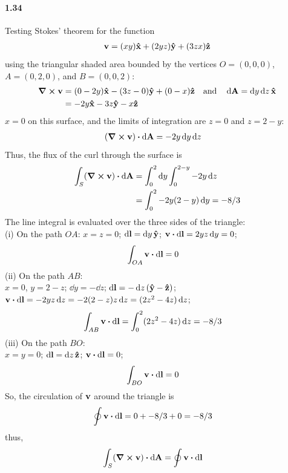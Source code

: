 \documentclass[../main.tex]{subfiles}
\begin{document}
\paragraph{1.34}
Testing Stokes' theorem for the function
\begin{align*}
    \vb{v} = (xy) \vu{x} + (2yz) \vu{y} + (3zx)\vu{z}
\end{align*}
using the triangular shaded area bounded by the vertices
$O = (0,0,0)$, $A = (0,2,0)$, and $B = (0,0,2)$:
\begin{align*}
    \curl{\vb{v}} &= (0 - 2y) \vu{x} - (3z - 0) \vu{y} + (0 - x) \vu{z}
                                                        \qand \dd{\vb{A}} = \dd{y}\dd{z} \vu{x} \\
                  &= -2y \vu{x} - 3z \vu{y} - x \vu{z}
\end{align*}
$x=0$ on this surface, and the limits of integration are $z = 0$ and $z = 2 - y$:
\begin{align*}
    (\curl{\vb{v}}) \vdot \dd{\vb{A}} &= -2y \dd{y}\dd{z}
\end{align*}
Thus, the flux of the curl through the surface is
\begin{align*}
    \int_S (\curl{\vb{v}}) \vdot \dd{\vb{A}} &= \int_0^2 \dd{y}\int_0^{2-y} -2y \dd{z} \\
    &= \int_0^2 -2y(2-y) \dd{y} = -8/3
\end{align*}
The line integral is evaluated over the three sides of the triangle: \\
(i) On the path $OA$:
$x = z = 0$; $\dd{\vb{l}} = \dd{y} \vu{y}$; $\vb{v} \vdot \dd{\vb{l}} = 2yz \dd{y} = 0$;
\begin{align*}
    \int_{OA} \vb{v} \vdot \dd{\vb{l}} &= 0
\end{align*}
(ii) On the path $AB$: \\
$x = 0$, $y = 2 - z$; $\dd{y} = -\dd{z}$; $\dd{\vb{l}} = -\dd{z}(\vu{y} - \vu{z})$;
$\vb{v} \vdot \dd{\vb{l}} = -2yz \dd{z} = -2(2 - z)z \dd{z} = (2z^2 - 4z) \dd{z}$;
\begin{align*}
    \int_{AB} \vb{v} \vdot \dd{\vb{l}} &= \int_0^2 (2z^2 - 4z) \dd{z} = -8/3
\end{align*}
(iii) On the path $BO$: \\
$x = y = 0$; $\dd{\vb{l}} = \dd{z} \vu{z}$; $\vb{v} \vdot \dd{\vb{l}} = 0$;
\begin{align*}
    \int_{BO} \vb{v} \vdot \dd{\vb{l}} &= 0
\end{align*}
So, the circulation of $\vb{v}$ around the triangle is
\begin{align*}
    \oint \vb{v} \vdot \dd{\vb{l}} &= 0 + -8/3 + 0 = -8/3
\end{align*}
thus,
\begin{align*}
    \int_S (\curl{\vb{v}}) \vdot \dd{\vb{A}} &= \oint \vb{v} \vdot \dd{\vb{l}}
\end{align*}
\end{document}
